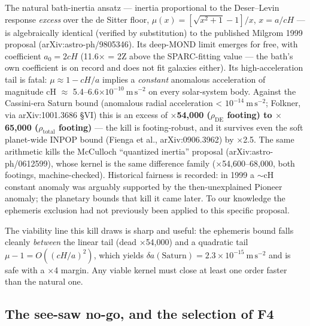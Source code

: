 \documentclass[11pt,a4paper]{article}
\begin{document}
The natural bath-inertia ansatz --- inertia proportional to the Deser--Levin response \emph{excess} over the de Sitter floor, $\mu(x) = [\sqrt{x^2+1} - 1]/x$, $x = a/cH$ --- is algebraically identical (verified by substitution) to the published Milgrom 1999 proposal (arXiv:astro-ph/9805346). Its deep-MOND limit emerges for free, with coefficient $a_0 = 2cH$ (11.6$\times$ = 2Z above the SPARC-fitting value --- the bath's own coefficient is on record and does not fit galaxies either). Its high-acceleration tail is fatal: $\mu \approx 1 - cH/a$ implies a \emph{constant} anomalous acceleration of magnitude cH $\approx$ 5.4--6.6$\times10^{-10}\ \mathrm{m\,s^{-2}}$ on every solar-system body. Against the Cassini-era Saturn bound (anomalous radial acceleration < $10^{-14}\ \mathrm{m\,s^{-2}}$; Folkner, via arXiv:1001.3686 \S{}VI) this is an excess of \textbf{$\times$54,000 ($\rho_{\mathrm{DE}}$ footing) to $\times$65,000 ($\rho_{\mathrm{total}}$ footing)} --- the kill is footing-robust, and it survives even the soft planet-wide INPOP bound (Fienga et al., arXiv:0906.3962) by $\times$2.5. The same arithmetic kills the McCulloch ``quantized inertia'' proposal (arXiv:astro-ph/0612599), whose kernel is the same difference family ($\times$54,600--68,000, both footings, machine-checked). Historical fairness is recorded: in 1999 a $\sim$cH constant anomaly was arguably supported by the then-unexplained Pioneer anomaly; the planetary bounds that kill it came later. To our knowledge the ephemeris exclusion had not previously been applied to this specific proposal.

The viability line this kill draws is sharp and useful: the ephemeris bound falls cleanly \emph{between} the linear tail (dead $\times$54,000) and a quadratic tail $\mu - 1 = O((cH/a)^2)$, which yields $\delta a(\mathrm{Saturn}) = 2.3\times10^{-15}\ \mathrm{m\,s^{-2}}$ and is safe with a $\times$4 margin. Any viable kernel must close at least one order faster than the natural one.

\subsection{The see-saw no-go, and the selection of F4}
\end{document}
